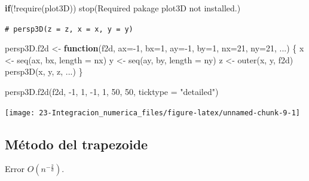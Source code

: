 \documentclass[
]{book}
\newenvironment{Shaded}{\begin{snugshade}}{\end{snugshade}}
\newcommand{\AttributeTok}[1]{\textcolor[rgb]{0.77,0.63,0.00}{#1}}
\newcommand{\CommentTok}[1]{\textcolor[rgb]{0.56,0.35,0.01}{\textit{#1}}}
\newcommand{\ControlFlowTok}[1]{\textcolor[rgb]{0.13,0.29,0.53}{\textbf{#1}}}
\newcommand{\DecValTok}[1]{\textcolor[rgb]{0.00,0.00,0.81}{#1}}
\newcommand{\FunctionTok}[1]{\textcolor[rgb]{0.00,0.00,0.00}{#1}}
\newcommand{\NormalTok}[1]{#1}
\newcommand{\OtherTok}[1]{\textcolor[rgb]{0.56,0.35,0.01}{#1}}
\newcommand{\SpecialCharTok}[1]{\textcolor[rgb]{0.00,0.00,0.00}{#1}}
\newcommand{\StringTok}[1]{\textcolor[rgb]{0.31,0.60,0.02}{#1}}
\theoremstyle{break}
\theoremstyle{nonumberplain}
\renewcommand{\CommentTok}[1]{\textcolor[rgb]{0.41,0.41,0.41}{\texttt{#1}}}
\begin{document}
\begin{Shaded}
\begin{Highlighting}[]
\ControlFlowTok{if}\NormalTok{(}\SpecialCharTok{!}\FunctionTok{require}\NormalTok{(plot3D)) }\FunctionTok{stop}\NormalTok{(}\StringTok{\textquotesingle{}Required pakage \textasciigrave{}plot3D\textasciigrave{} not installed.\textquotesingle{}}\NormalTok{)}

\CommentTok{\# persp3D(z = z, x = x, y = y)}

\NormalTok{persp3D.f2d }\OtherTok{\textless{}{-}} \ControlFlowTok{function}\NormalTok{(f2d, }\AttributeTok{ax=}\SpecialCharTok{{-}}\DecValTok{1}\NormalTok{, }\AttributeTok{bx=}\DecValTok{1}\NormalTok{, }\AttributeTok{ay=}\SpecialCharTok{{-}}\DecValTok{1}\NormalTok{, }\AttributeTok{by=}\DecValTok{1}\NormalTok{, }\AttributeTok{nx=}\DecValTok{21}\NormalTok{, }\AttributeTok{ny=}\DecValTok{21}\NormalTok{, ...) \{ }
\NormalTok{  x }\OtherTok{\textless{}{-}} \FunctionTok{seq}\NormalTok{(ax, bx, }\AttributeTok{length =}\NormalTok{ nx)}
\NormalTok{  y }\OtherTok{\textless{}{-}} \FunctionTok{seq}\NormalTok{(ay, by, }\AttributeTok{length =}\NormalTok{ ny)}
\NormalTok{  z }\OtherTok{\textless{}{-}} \FunctionTok{outer}\NormalTok{(x, y, f2d)}
  \FunctionTok{persp3D}\NormalTok{(x, y, z, ...)}
\NormalTok{\}}

\FunctionTok{persp3D.f2d}\NormalTok{(f2d, }\SpecialCharTok{{-}}\DecValTok{1}\NormalTok{, }\DecValTok{1}\NormalTok{, }\SpecialCharTok{{-}}\DecValTok{1}\NormalTok{, }\DecValTok{1}\NormalTok{, }\DecValTok{50}\NormalTok{, }\DecValTok{50}\NormalTok{, }\AttributeTok{ticktype =} \StringTok{"detailed"}\NormalTok{) }
\end{Highlighting}
\end{Shaded}

\begin{center}\texttt{[image: 23-Integracion\_numerica\_files/figure-latex/unnamed-chunk-9-1]} \end{center}

\hypertarget{muxe9todo-del-trapezoide-1}{%
\subsection{Método del trapezoide}\label{muxe9todo-del-trapezoide-1}}

Error \(O(n^{-\frac{2}{d}})\).
\end{document}
